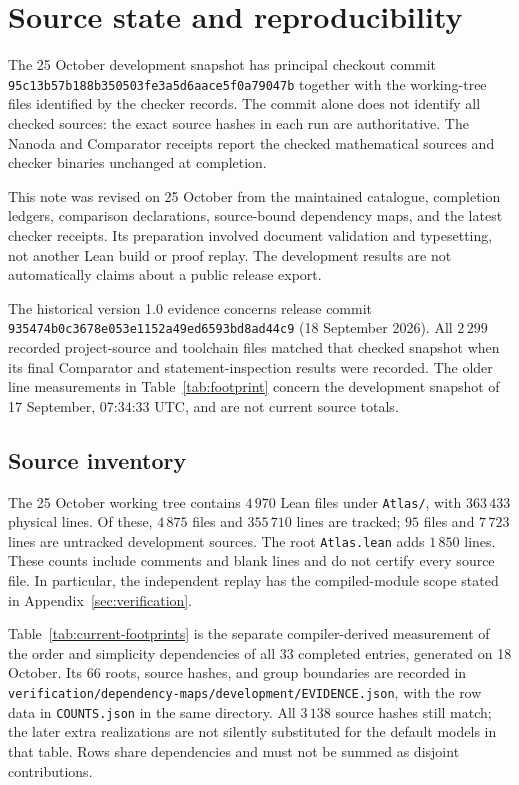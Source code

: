\documentclass[11pt]{article}
\numberwithin{equation}{section}
\theoremstyle{definition}
\newcommand{\code}[1]{\texttt{\small #1}}
\newcommand{\leanname}[1]{{\small\nolinkurl{#1}}}
\begin{document}
\section{Source state and reproducibility}\label{app:provenance}

The 25 October development snapshot has principal checkout commit
\leanname{95c13b57b188b350503fe3a5d6aace5f0a79047b} together with the
working-tree files identified by the checker records. The commit alone
does not identify all checked sources: the exact source hashes in each
run are authoritative. The Nanoda and Comparator receipts report the
checked mathematical sources and checker binaries unchanged at completion.

This note was revised on 25 October from the maintained catalogue,
completion ledgers, comparison declarations, source-bound dependency
maps, and the latest checker receipts. Its preparation involved document
validation and typesetting, not another Lean build or proof replay.
The development results are not automatically claims about a public
release export.

The historical version 1.0 evidence concerns release commit
\leanname{935474b0c3678e053e1152a49ed6593bd8ad44c9}
(18 September 2026). All $2\,299$ recorded project-source and toolchain
files matched that checked snapshot when its final Comparator and
statement-inspection results were recorded. The older line measurements
in Table~\ref{tab:footprint} concern the development snapshot of
17 September, 07:34:33 UTC, and are not current source totals.


\subsection{Source inventory}

The 25 October working tree contains $4\,970$ Lean files under
\code{Atlas/}, with $363\,433$ physical lines. Of these, $4\,875$ files
and $355\,710$ lines are tracked; $95$ files and $7\,723$ lines are
untracked development sources. The root \code{Atlas.lean} adds $1\,850$
lines. These counts include comments and blank lines and do not certify
every source file. In particular, the independent replay has the
compiled-module scope stated in Appendix~\ref{sec:verification}.

Table~\ref{tab:current-footprints} is the separate compiler-derived
measurement of the order and simplicity dependencies of all $33$
completed entries, generated on 18 October. Its $66$ roots, source
hashes, and group boundaries are recorded in
\leanname{verification/dependency-maps/development/EVIDENCE.json}, with
the row data in \leanname{COUNTS.json} in the same directory. All $3\,138$
source hashes still match; the later extra realizations are not
silently substituted for the default models in that table. Rows share
dependencies and must not be summed as disjoint contributions.
\end{document}
